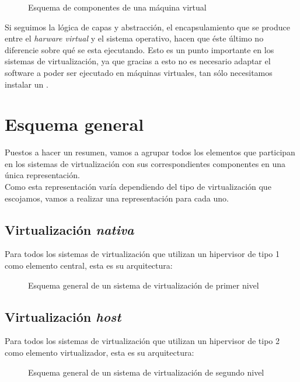 \begin{figure}[H]
\begin{center}
\end{center}
\caption[Maquina Virtual]{Esquema de componentes de una máquina virtual}
\end{figure}

Si seguimos la lógica de capas y abstracción, el encapsulamiento que se produce entre el \emph{harware virtual} y el sistema operativo, hacen que éste último no diferencie sobre qué se esta ejecutando. Esto es un punto importante en los sistemas de virtualización, ya que gracias a esto no es necesario adaptar el software a poder ser ejecutado en máquinas virtuales, tan sólo necesitamos instalar un .


\section{Esquema general}
Puestos a hacer un resumen, vamos a agrupar todos los elementos que participan en los sistemas de virtualización con sus correspondientes componentes en una única representación.\\

Como esta representación varía dependiendo del tipo de virtualización que escojamos, vamos a realizar una representación para cada uno.

\subsection{Virtualización \emph{nativa}}
Para todos los sistemas de virtualización que utilizan un hipervisor de tipo 1 como elemento central, esta es su arquitectura:

\begin{figure}[H]
\begin{center}
\end{center}
\caption[Virtualización \emph{nativa}]{Esquema general de un sistema de virtualización de primer nivel}
\end{figure}

\subsection{Virtualización \emph{host}}
Para todos los sistemas de virtualización que utilizan un hipervisor de tipo 2 como elemento virtualizador, esta es su arquitectura:

\begin{figure}[H]
\begin{center}
\end{center}
\caption[Virtualización \emph{host}]{Esquema general de un sistema de virtualización de segundo nivel}
\end{figure}
